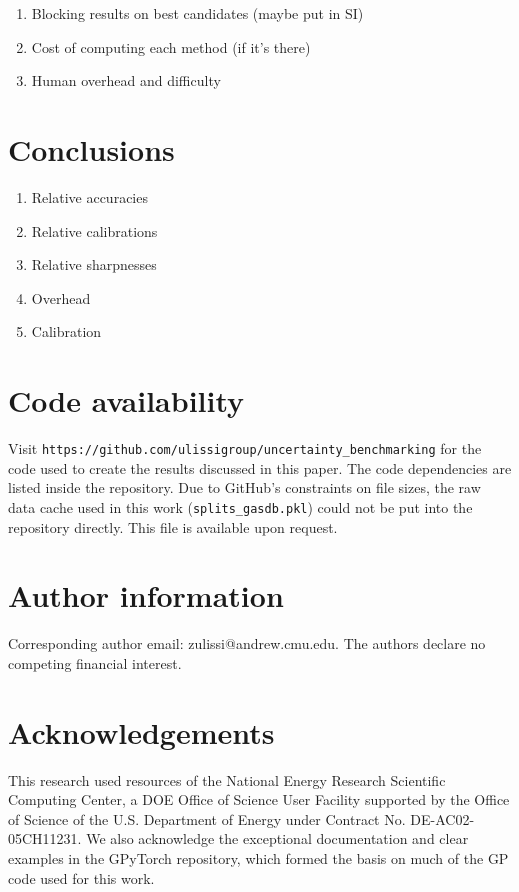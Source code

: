\documentclass[]{achemso}
\begin{document}
\begin{enumerate}
    \item{Blocking results on best candidates (maybe put in SI)}
    \item{Cost of computing each method (if it’s there)}
    \item{Human overhead and difficulty}
\end{enumerate}



\section{Conclusions}

\begin{enumerate}
    \item{Relative accuracies}
    \item{Relative calibrations}
    \item{Relative sharpnesses}
    \item{Overhead}
    \item{Calibration}
\end{enumerate}



\section*{Code availability} Visit \texttt{https://github.com/ulissigroup/uncertainty\_benchmarking} for the code used to create the results discussed in this paper.
The code dependencies are listed inside the repository.
Due to GitHub's constraints on file sizes, the raw data cache used in this work (\texttt{splits\_gasdb.pkl}) could not be put into the repository directly.
This file is available upon request.

\section*{Author information} Corresponding author email:  zulissi@andrew.cmu.edu.
The authors declare no competing financial interest.

\section*{Acknowledgements} This research used resources of the National Energy Research Scientific Computing Center, a DOE Office of Science User Facility supported by the Office of Science of the U.S. Department of Energy under Contract No. DE-AC02-05CH11231. %
We also acknowledge the exceptional documentation and clear examples in the GPyTorch\cite{Gardner2018} repository, which formed the basis on much of the \gls{GP} code used for this work.



\clearpage

\end{document}
